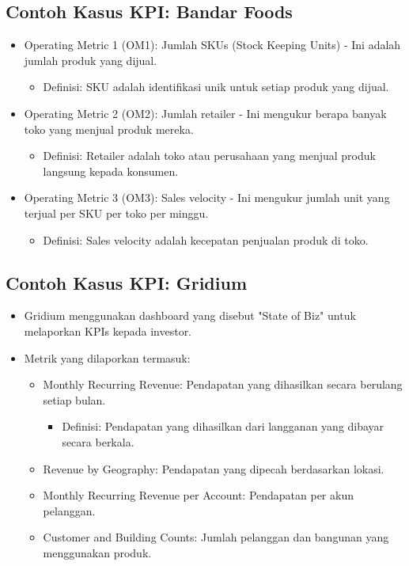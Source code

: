 \documentclass{article}
\begin{document}
\subsection{Contoh Kasus KPI: Bandar Foods}
\begin{itemize}
    \item Operating Metric 1 (OM1): Jumlah SKUs (Stock Keeping Units) - Ini adalah jumlah produk yang dijual.
          \begin{itemize}
              \item Definisi: SKU adalah identifikasi unik untuk setiap produk yang dijual.
          \end{itemize}
    \item Operating Metric 2 (OM2): Jumlah retailer - Ini mengukur berapa banyak toko yang menjual produk mereka.
          \begin{itemize}
              \item Definisi: Retailer adalah toko atau perusahaan yang menjual produk langsung kepada konsumen.
          \end{itemize}
    \item Operating Metric 3 (OM3): Sales velocity - Ini mengukur jumlah unit yang terjual per SKU per toko per minggu.
          \begin{itemize}
              \item Definisi: Sales velocity adalah kecepatan penjualan produk di toko.
          \end{itemize}
\end{itemize}

\subsection{Contoh Kasus KPI: Gridium}
\begin{itemize}
    \item Gridium menggunakan dashboard yang disebut "State of Biz" untuk melaporkan KPIs kepada investor.
    \item Metrik yang dilaporkan termasuk:
          \begin{itemize}

              \item Monthly Recurring Revenue: Pendapatan yang dihasilkan secara berulang setiap bulan.
                    \begin{itemize}
                        \item Definisi: Pendapatan yang dihasilkan dari langganan yang dibayar secara berkala.
                    \end{itemize}
              \item Revenue by Geography: Pendapatan yang dipecah berdasarkan lokasi.
              \item Monthly Recurring Revenue per Account: Pendapatan per akun pelanggan.
              \item Customer and Building Counts: Jumlah pelanggan dan bangunan yang menggunakan produk.
          \end{itemize}
\end{itemize}
\end{document}
